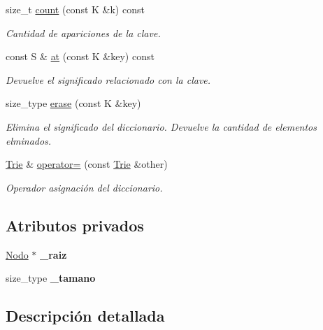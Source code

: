 \begin{DoxyCompactItemize}
size\-\_\-t \hyperlink{classTrie_a234d4939fdf3278fd2395ba90d6b9773}{count} (const K \&k) const 
\begin{DoxyCompactList}\small\item\em Cantidad de apariciones de la clave. \end{DoxyCompactList}\item 
const S \& \hyperlink{classTrie_a97f6c7eb4db7f545364cde047a9ebc0e}{at} (const K \&key) const 
\begin{DoxyCompactList}\small\item\em Devuelve el significado relacionado con la clave. \end{DoxyCompactList}\item 
size\-\_\-type \hyperlink{classTrie_affffdacc57ef546af2a1e72076ed90e3}{erase} (const K \&key)
\begin{DoxyCompactList}\small\item\em Elimina el significado del diccionario. Devuelve la cantidad de elementos elminados. \end{DoxyCompactList}\item 
\hyperlink{classTrie}{Trie} \& \hyperlink{classTrie_aec0e26545ce41199eabed9483ea6bccd}{operator=} (const \hyperlink{classTrie}{Trie} \&other)
\begin{DoxyCompactList}\small\item\em Operador asignación del diccionario. \end{DoxyCompactList}\end{DoxyCompactItemize}
\subsection*{Atributos privados}
\begin{DoxyCompactItemize}
\item 
\hypertarget{classTrie_a8ec366e26c8e54678e93eefb28487c87}{\hyperlink{structTrie_1_1Nodo}{Nodo} $\ast$ {\bfseries \-\_\-raiz}}\label{classTrie_a8ec366e26c8e54678e93eefb28487c87}

\item 
\hypertarget{classTrie_a734f044a90ba210c48a8839ee8024b59}{size\-\_\-type {\bfseries \-\_\-tamano}}\label{classTrie_a734f044a90ba210c48a8839ee8024b59}

\end{DoxyCompactItemize}


\subsection{Descripción detallada}

